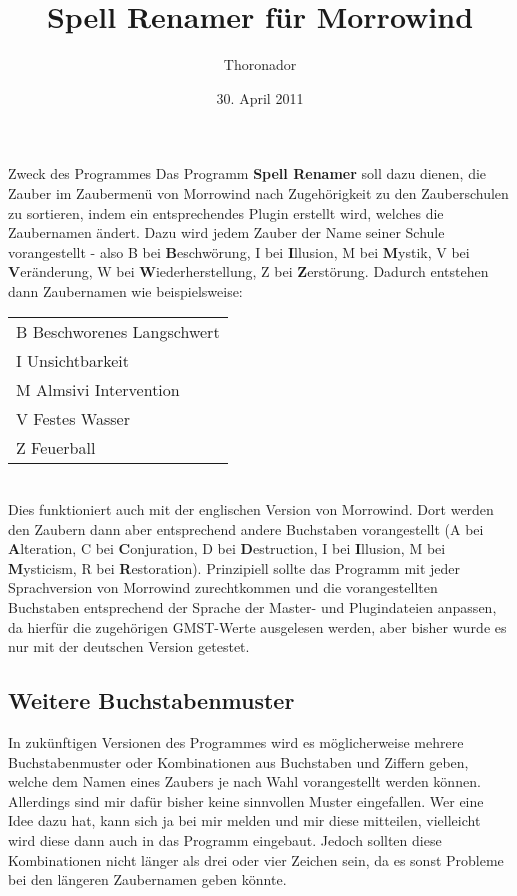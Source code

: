 \documentclass[12pt,oneside,a4paper]{article}
\title{Spell Renamer f\"{u}r Morrowind}
\author{Thoronador}
\date{30. April 2011}
\begin{document}
\maketitle

\begin{section}{Zweck des Programmes}
Das Programm \textbf{Spell Renamer} soll dazu dienen, die Zauber im Zaubermen\"{u}
von Morrowind nach Zugeh\"{o}rigkeit zu den Zauberschulen zu sortieren, indem
ein entsprechendes Plugin erstellt wird, welches die Zaubernamen \"{a}ndert.
Dazu wird jedem Zauber der Name seiner Schule vorangestellt - also B bei
\textbf{B}eschw\"{o}rung, I bei \textbf{I}llusion, M bei \textbf{M}ystik, V bei
\textbf{V}er\"{a}nderung, W bei \textbf{W}iederherstellung, Z bei
\textbf{Z}erst\"{o}rung.
Dadurch entstehen dann Zau\-ber\-na\-men wie beispielsweise:\\

\begin{tabular}{l}
B Beschworenes Langschwert\\
I Unsichtbarkeit\\
M Almsivi Intervention\\
V Festes Wasser\\
Z Feuerball\\
\end{tabular}
\\

Dies funktioniert auch mit der englischen Version von Morrowind. Dort werden
den Zaubern dann aber entsprechend andere Buchstaben vorangestellt (A bei
\textbf{A}lteration, C bei \textbf{C}onjuration, D bei \textbf{D}estruction,
I bei \textbf{I}llusion, M bei \textbf{M}ysticism, R bei \textbf{R}estoration).
Prinzipiell sollte das Programm mit jeder Sprachversion von Morrowind zurechtkommen
und die vorangestellten Buchstaben entsprechend der Sprache der Master- und
Plugindateien anpassen, da hierf\"{u}r die zugeh\"{o}rigen GMST-Werte ausgelesen werden,
aber bisher wurde es nur mit der deutschen Version getestet.

\subsection{Weitere Buchstabenmuster}
In zuk\"{u}nftigen Versionen des Programmes wird es m\"{o}glicherweise mehrere
Buchstabenmuster oder Kombinationen aus Buchstaben und Ziffern geben, welche
dem Namen eines Zaubers je nach Wahl vorangestellt werden k\"{o}nnen. Allerdings
sind mir daf\"{u}r bisher keine sinnvollen Muster eingefallen. Wer eine Idee dazu
hat, kann sich ja bei mir melden und mir diese mitteilen, vielleicht wird diese
dann auch in das Programm eingebaut. Jedoch sollten diese Kombinationen nicht
l\"{a}nger als drei oder vier Zeichen sein, da es sonst Probleme bei den l\"{a}ngeren
Zaubernamen geben k\"{o}nnte.


\end{section}
\end{document}
